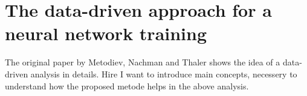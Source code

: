 \chapter{The data-driven approach for a neural network training}
\label{appendix:data_driven}
The original paper by Metodiev, Nachman and Thaler \cite{Metodiev_2017} shows the idea of a data-driven analysis in details. Hire I want to introduce main concepts, necessery to understand how the proposed metode helps in the above analysis.





